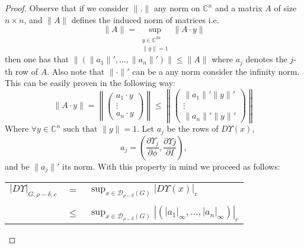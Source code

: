 \begin{proof}
Observe that if we consider $\|.\|$ any norm on $\mathbb{C}^n$ and a matrix $A$ of size $n\times n$, and $\|A\|$ defines the induced norm of matrices  i.e.
$$\|A\| = \sup_{\substack{y\in\mathbb{C}^{2n} \\ \|y\| = 1}}\|A\cdot y\|$$
then one has that $\|(\|a_1\|',\ldots,\|a_n\|')\| \leq \|A\|$ where $a_j$ denotes the $j$-th row of $A$. Also note that $\|\cdot\|'$ can be a any norm consider the infinity norm. This can be easily proven in the following way:
$$\|A\cdot y\| = \left\|\left(\begin{array}{c}a_1\cdot y \\ \vdots \\ a_n\cdot y\end{array}\right)\right\| \leq \left\|\left(\begin{array}{c}
\|a_1\|'\|y\|' \\ \vdots \\ \|a_n\|'\|y\|'
\end{array}\right)\right\|$$
Where $\forall y \in \mathbb{C}^n \text{ such that } \|y\| = 1$.
Let $a_j$ be the rows of $D\Upsilon(x)$,
$$ a_j = \left(\frac{\partial \Upsilon_j}{\partial \phi},\frac{\partial \Upsilon j}{\partial I}\right),$$
and be $\|a_j\|'$ its norm.
With this property in mind we proceed as follows:
\begin{longtable}{rcl}
$|D\Upsilon|_{G,\rho-\delta,c}$ & $=$ & $\displaystyle\sup_{x\in \mathcal{D}_{\rho-\delta}(G)} |D\Upsilon(x)|_c$ \\
\\
& $\leq$ & $\displaystyle\sup_{x\in \mathcal{D}_{\rho-\delta}(G)} |(|a_1|_\infty,\ldots,|a_n|_\infty)|_c$\\


\end{longtable}
\end{proof}
